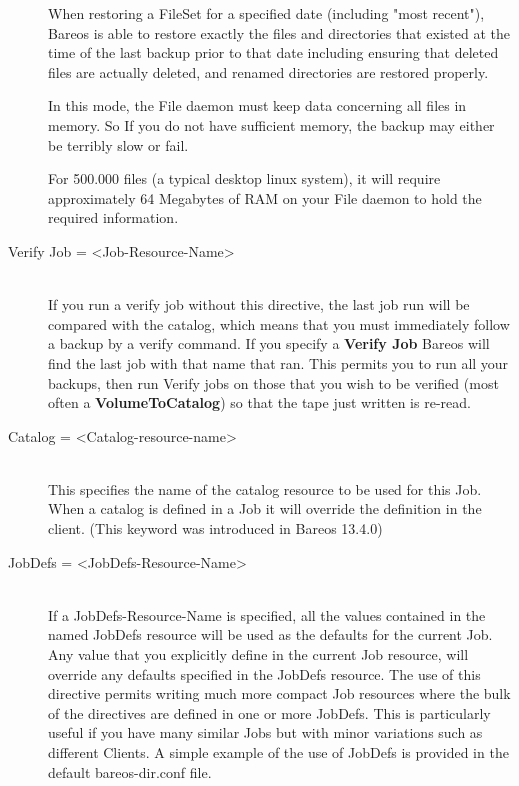 \begin{description}
{When restoring a FileSet for a specified date (including "most
recent"), Bareos is able to restore exactly the files and
directories that existed at the time of the last backup prior to
that date including ensuring that deleted files are actually deleted,
and renamed directories are restored properly.

In this mode, the File daemon must keep data concerning all files in
memory.  So If you do not have sufficient memory, the backup may
either be terribly slow or fail.


For 500.000 files (a typical desktop linux system), it will require
approximately 64 Megabytes of RAM on your File daemon to hold the
required information.
}

\item [Verify Job = {\textless}Job-Resource-Name{\textgreater}] \hfill \\
If you run a verify job without this directive, the last job run will be
compared with the catalog, which means that you must immediately follow
a backup by a verify command.  If you specify a {\bf Verify Job} Bareos
will find the last job with that name that ran.  This permits you to run
all your backups, then run Verify jobs on those that you wish to be
verified (most often a {\bf VolumeToCatalog}) so that the tape just
written is re-read.

\item [Catalog = {\textless}Catalog-resource-name{\textgreater}] \hfill \\
This specifies the name of the catalog resource to be used for this Job.
When a catalog is defined in a Job it will override the definition in
the client. (This keyword was introduced in Bareos 13.4.0)

\item [JobDefs = {\textless}JobDefs-Resource-Name{\textgreater}] \hfill \\
If a JobDefs-Resource-Name is specified, all the values contained in the
named JobDefs resource will be used as the defaults for the current Job.
Any value that you explicitly define in the current Job resource, will
override any defaults specified in the JobDefs resource.  The use of
this directive permits writing much more compact Job resources where the
bulk of the directives are defined in one or more JobDefs.  This is
particularly useful if you have many similar Jobs but with minor
variations such as different Clients.  A simple example of the use of
JobDefs is provided in the default bareos-dir.conf file.


\end{description}
